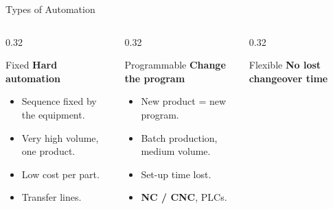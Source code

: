 \documentclass[aspectratio=169]{beamer}
\begin{document}
	\begin{frame}{Types of Automation}
		\begin{columns}[T]
			\begin{column}{0.32\textwidth}
				\begin{block}{Fixed}
					\centering
					\textbf{Hard automation}

					\vspace{0.2cm}

					\begin{itemize}\small
						\item Sequence fixed by the equipment.
						\item Very high volume, one product.
						\item Low cost per part.
						\item Transfer lines.
					\end{itemize}
				\end{block}
			\end{column}
			\begin{column}{0.32\textwidth}
				\begin{block}{Programmable}
					\centering
					\textbf{Change the program}

					\vspace{0.2cm}

					\begin{itemize}\small
						\item New product = new program.
						\item Batch production, medium volume.
						\item Set-up time lost.
						\item \textbf{NC / CNC}, PLCs.
					\end{itemize}
				\end{block}
			\end{column}
			\begin{column}{0.32\textwidth}
				\begin{block}{Flexible}
					\centering
					\textbf{No lost changeover time}

					\vspace{0.2cm}


\end{block}
\end{column}
\end{columns}
\end{frame}
\end{document}
